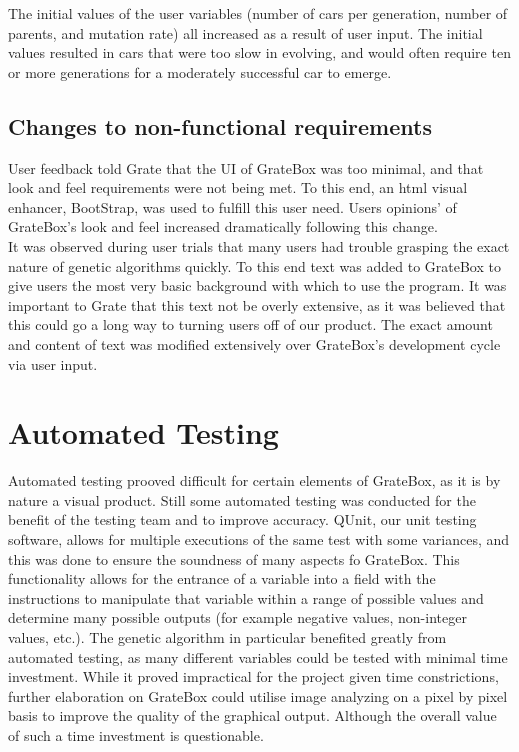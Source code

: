\documentclass[12pt, titlepage]{article}
\begin{document}
The initial values of the user variables (number of cars per generation, number of parents, and mutation rate) all increased as a result of user input. The initial values resulted in cars that were too slow in evolving, and would often require ten or more generations for a moderately successful car to emerge. 

\subsection{Changes to non-functional requirements}

User feedback told Grate that the UI of GrateBox was too minimal, and that look and feel requirements were not being met. To this end, an html visual enhancer, BootStrap, was used to fulfill this user need. Users opinions' of GrateBox's look and feel increased dramatically following this change.\\


It was observed during user trials that many users had trouble grasping the exact nature of genetic algorithms quickly. To this end text was added to GrateBox to give users the most very basic background with which to use the program. It was important to Grate that this text not be overly extensive, as it was believed that this could go a long way to turning users off of our product. The exact amount and content of text was modified extensively over GrateBox's development cycle via user input.

\section{Automated Testing}

Automated testing prooved difficult for certain elements of GrateBox, as it is by nature a visual product. Still some automated testing was conducted for the benefit of the testing team and to improve accuracy. QUnit, our unit testing software, allows for multiple executions of the same test with some variances, and this was done to ensure the soundness of many aspects fo GrateBox. This functionality allows for the entrance of a variable into a field with the instructions to manipulate that variable within a range of possible values and determine many possible outputs (for example negative values, non-integer values, etc.). The genetic algorithm in particular benefited greatly from automated testing, as many different variables could be tested with minimal time investment. While it proved impractical for the project given time constrictions, further elaboration on GrateBox could utilise image analyzing on a pixel by pixel basis to improve the quality of the graphical output. Although the overall value of such a time investment is questionable.
		
\end{document}

